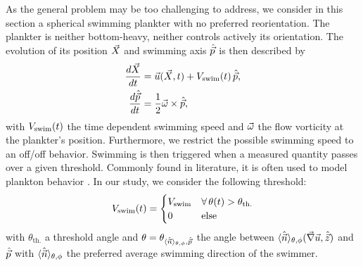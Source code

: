 As the general problem may be too challenging to address, we consider in this section a spherical swimming plankter with no preferred reorientation.
The plankter is neither bottom-heavy, neither controls actively its orientation.
The evolution of its position $\vec{X}$ and swimming axis $\hat{\vec{p}}$ is then described by
\begin{subequations}\label{eq:spherical_motion}
	\begin{align}
		\frac{d \vec{X}}{dt} & =
		 \vec{u} (\vec{X}, t) + V_{\mathrm{swim}}(t) \, \hat{\vec{p}},\\
		\frac{d \hat{\vec{p}}}{dt} & = \frac{1}{2} \vec{\omega} \times \hat{\vec{p}},
	\end{align}
\end{subequations}
with $V_{\mathrm{swim}}(t)$ the time dependent swimming speed and $\vec{\omega}$ the flow vorticity at the plankter's position.
Furthermore, we restrict the possible swimming speed to an off/off behavior.
Swimming is then triggered when a measured quantity passes over a given threshold.
Commonly found in literature, it is often used to model plankton behavior \citep{wheeler2019not, yamazaki2003modeling, dodson1997daphnia}.
In our study, we consider the following threshold:
\begin{equation}\label{eq:on_off_behavior}
	V_{\mathrm{swim}}(t) =
	\begin{cases}
		V_{\mathrm{swim}} & \forall \, \theta(t) > \theta_{\mathrm{th.}} \\
		0 & \mathrm{else}
	\end{cases}
\end{equation}
with $\theta_{\mathrm{th.}}$ a threshold angle and $\theta = \theta_{\langle \hat{\vec{n}} \rangle_{\theta, \phi}, \hat{\vec{p}}}$ the angle between $\langle \hat{\vec{n}} \rangle_{\theta, \phi} (\vec{\nabla} \vec{u}, \hat{\vec{z}})$ and $\hat{\vec{p}}$ with $\langle \hat{\vec{n}} \rangle_{\theta, \phi}$ the preferred average swimming direction of the swimmer.

